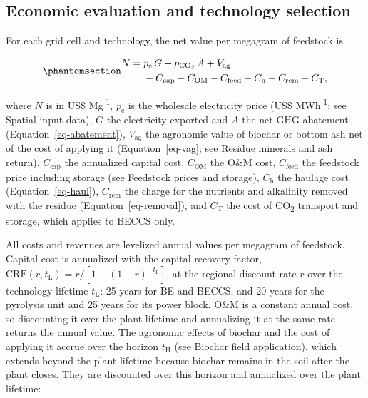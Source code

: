 \documentclass[
  letterpaper,
  twoside,
  twocolumn,
  9pt]{article}
\begin{document}
\subsection{Economic evaluation and technology
selection}\label{economic-evaluation-and-technology-selection}

For each grid cell and technology, the net value per megagram of
feedstock is

\begin{equation}\phantomsection\label{eq-net-value}{\begin{aligned}
N = {} & p_{\mathrm{e}}\, G + p_{\mathrm{CO_2}}\, A + V_{\mathrm{ag}} \\
& - C_{\mathrm{cap}} - C_{\mathrm{OM}} - C_{\mathrm{feed}} - C_{\mathrm{h}} - C_{\mathrm{rem}} - C_{\mathrm{T}},
\end{aligned}}\end{equation}

where \(N\) is in US\$ Mg\textsuperscript{-1}, \(p_{\mathrm{e}}\) is the
wholesale electricity price (US\$ MWh\textsuperscript{-1}; see Spatial
input data), \(G\) the electricity exported and \(A\) the net GHG
abatement (Equation~\ref{eq-abatement}), \(V_{\mathrm{ag}}\) the
agronomic value of biochar or bottom ash net of the cost of applying it
(Equation~\ref{eq-vag}; see Residue minerals and ash return),
\(C_{\mathrm{cap}}\) the annualized capital cost, \(C_{\mathrm{OM}}\)
the O\&M cost, \(C_{\mathrm{feed}}\) the feedstock price including
storage (see Feedstock prices and storage), \(C_{\mathrm{h}}\) the
haulage cost (Equation~\ref{eq-haul}), \(C_{\mathrm{rem}}\) the charge
for the nutrients and alkalinity removed with the residue
(Equation~\ref{eq-removal}), and \(C_{\mathrm{T}}\) the cost of
CO\textsubscript{2} transport and storage, which applies to BECCS only.

All costs and revenues are levelized annual values per megagram of
feedstock. Capital cost is annualized with the capital recovery factor,
\(\mathrm{CRF}(r, t_{\mathrm{L}}) = r / [1 - (1 + r)^{-t_{\mathrm{L}}}]\),
at the regional discount rate \(r\) over the technology lifetime
\(t_{\mathrm{L}}\): 25 years for BE and BECCS,\citep{dea2026} and 20
years for the pyrolysis unit and 25 years for its power
block.\citep{woolf2016optimal} O\&M is a constant annual cost, so
discounting it over the plant lifetime and annualizing it at the same
rate returns the annual value. The agronomic effects of biochar and the
cost of applying it accrue over the horizon \(t_{\mathrm{H}}\) (see
Biochar field application), which extends beyond the plant lifetime
because biochar remains in the soil after the plant closes. They are
discounted over this horizon and annualized over the plant lifetime:
\end{document}
